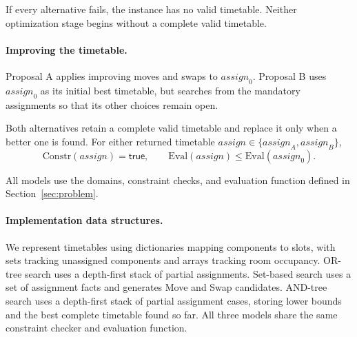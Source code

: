 If every alternative fails, the instance has no valid
timetable. Neither optimization stage begins without
a complete valid timetable.

\paragraph{Improving the timetable.}
Proposal A applies improving moves and swaps to
$\mathit{assign}_0$. Proposal B uses $\mathit{assign}_0$
as its initial best timetable, but searches from the mandatory
assignments so that its other choices remain open.

Both alternatives retain a complete valid timetable and
replace it only when a better one is found. For either
returned timetable
$\mathit{assign}\in\{\mathit{assign}_A,\mathit{assign}_B\}$,
\[
\mathrm{Constr}(\mathit{assign})=\mathsf{true},
\qquad
\mathrm{Eval}(\mathit{assign})
\le\mathrm{Eval}(\mathit{assign}_0).
\]

All models use the domains, constraint checks, and evaluation
function defined in Section~\ref{sec:problem}.


\paragraph{Implementation data structures.}
We represent timetables using dictionaries mapping components to slots,
with sets tracking unassigned components and arrays tracking room
occupancy. OR-tree search uses a depth-first stack of partial assignments.
Set-based search uses a set of assignment facts and generates Move and
Swap candidates. AND-tree search uses a depth-first stack of partial
assignment cases, storing lower bounds and the best complete timetable
found so far. All three models share the same constraint checker and
evaluation function.

\setlength{\parindent}{\savedparindent}
\setlength{\parskip}{\savedparskip}
